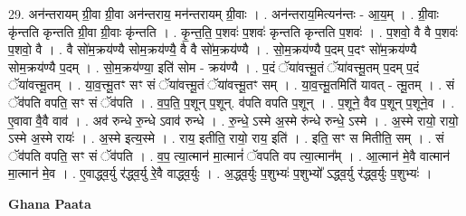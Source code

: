 \documentclass[17pt]{extarticle}
\begin{document}
29. अन॑न्तरायम् ग्री॒वा ग्री॒वा अन॑न्तराय॒ मन॑न्तरायम् ग्री॒वाः । . अन॑न्तराय॒मित्यन॑न्तः - आ॒य॒म् । . ग्री॒वाः कृ॑न्तति कृन्तति ग्री॒वा ग्री॒वाः कृ॑न्तति । . कृ॒न्त॒ति॒ प॒शवः॑ प॒शवः॑ कृन्तति कृन्तति प॒शवः॑ । . प॒शवो॒ वै वै प॒शवः॑ प॒शवो॒ वै । . वै सो॑म॒क्रय॑ण्यै सोम॒क्रय॑ण्यै॒ वै वै सो॑म॒क्रय॑ण्यै । . सो॒म॒क्रय॑ण्यै प॒दम् प॒दꣳ सो॑म॒क्रय॑ण्यै सोम॒क्रय॑ण्यै प॒दम् । . सो॒म॒क्रय॑ण्या॒ इति॑ सोम - क्रय॑ण्यै । . प॒दं ॅया॑वत्त्मू॒तं ॅया॑वत्त्मू॒तम् प॒दम् प॒दं ॅया॑वत्त्मू॒तम् । . या॒व॒त्त्मू॒तꣳ सꣳ सं ॅया॑वत्त्मू॒तं ॅया॑वत्त्मू॒तꣳ सम् । . या॒व॒त्त्मू॒तमिति॑ यावत् - त्मू॒तम् । . सं ॅव॑पति वपति॒ सꣳ सं ॅव॑पति । . व॒प॒ति॒ प॒शून् प॒शून्. व॑पति वपति प॒शून् । . प॒शूने॒ वैव प॒शून् प॒शूने॒व । . ए॒वावा वै॒वै वाव॑ । . अव॑ रुन्धे रु॒न्धे ऽवाव॑ रुन्धे । . रु॒न्धे॒ ऽस्मे अ॒स्मे रु॑न्धे रुन्धे॒ ऽस्मे । . अ॒स्मे रायो॒ रायो॒ ऽस्मे अ॒स्मे रायः॑ । . अ॒स्मे इत्य॒स्मे । . राय॒ इतीति॒ रायो॒ राय॒ इति॑ । . इति॒ सꣳ स मितीति॒ सम् । . सं ॅव॑पति वपति॒ सꣳ सं ॅव॑पति । . व॒प॒ त्या॒त्मान॑ मा॒त्मानं॑ ॅवपति वप त्या॒त्मान᳚म् । . आ॒त्मान॑ मे॒वै वात्मान॑ मा॒त्मान॑ मे॒व । . ए॒वाद्ध्व॒र्यु र॑द्ध्व॒र्यु रे॒वै वाद्ध्व॒र्युः । . अ॒द्ध्व॒र्युः प॒शुभ्यः॑ प॒शुभ्यो᳚ ऽद्ध्व॒र्यु र॑द्ध्व॒र्युः प॒शुभ्यः॑ । \newline

\textbf{Ghana Paata } \newline
\end{document}
